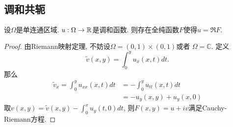 \subsection{调和共轭}
\begin{proposition}
    设$\Omega$是单连通区域. $u: \Omega \to \mathbb{R}$是调和函数. 则存在全纯函数$F$使得$u=\Re F$.
\end{proposition}
\begin{proof}
    由Riemann映射定理, 不妨设$\Omega = (0,1)\times (0,1)$或者 $\Omega= \mathbb{C}$.  定义
    \begin{equation}
        \tilde{v}(x,y)= \int^y_0 u_x(x,t)dt. 
    \end{equation}
    那么
    \begin{equation}
        \begin{split}
            \tilde{v}_x  =\int^y_0 u_{xx}(x,t)dt &=- \int^y_0 u_{tt}(x,t)dt \\
            &= -u_y(x,y)+u_y(x,0)
        \end{split}
    \end{equation}
    取$v(x,y)=\tilde{v}(x,y)- \int^x_0 u_y(t,0)dt$, 则$F(x,y)=u+iv$满足Cauchy-Riemann方程.
\end{proof}

